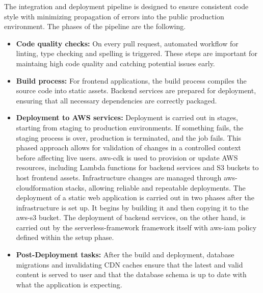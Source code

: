The integration and deployment pipeline is designed to ensure consistent code style with minimizing propagation of errors into the public production environment.
The phases of the pipeline are the following.
\begin{itemize}
    \item \textbf{Code quality checks:} On every pull request, automated workflow for linting, type checking and spelling is triggered. These steps are important for maintaing high code quality and catching potential issues early.
    \item \textbf{Build process:} For frontend applications, the build process compiles the source code into static assets. Backend services are prepared for deployment, ensuring that all necessary dependencies are correctly packaged.
    \item \textbf{Deployment to AWS services:} Deployment is carried out in stages, starting from staging to production environments. If something fails, the staging process is over, production is terminated, and the job fails. This phased approach allows for validation of changes in a controlled context before affecting live users. \gls{aws-cdk} is used to provision or update \ac{AWS} resources, including Lambda functions for backend services and \ac{S3} buckets to host frontend assets. Infrastructure changes are managed through \gls{aws-cloudformation} stacks, allowing reliable and repeatable deployments.
    The deployment of a static web application is carried out in two phases after the infrastructure is set up.
    It begins by building it and then copying it to the \gls{aws-s3} bucket.
    The deployment of backend services, on the other hand, is carried out by the \gls{serverless-framework} framework itself with \gls{aws-iam} policy defined within the setup phase.
    \item \textbf{Post-Deployment tasks:} After the build and deployment, database migrations and invalidating CDN caches ensure that the latest and valid content is served to user and that the database schema is up to date with what the application is expecting.
\end{itemize}

